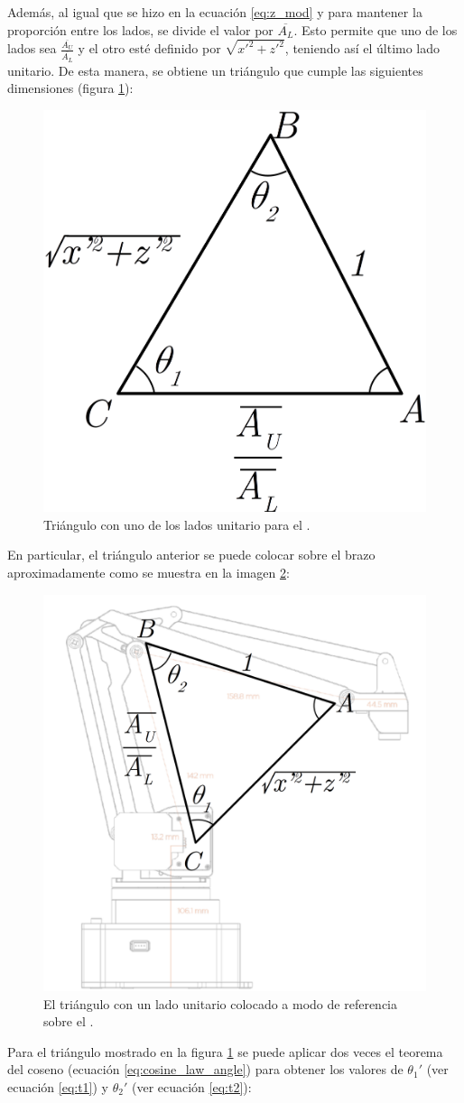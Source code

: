 Además, al igual que se hizo en la ecuación \ref{eq:z_mod} y para mantener la proporción
entre los lados, se divide el valor por $\overline{A_L}$. Esto permite que uno de los
lados sea $\frac{\overline{A_U}}{\overline{A_L}}$ y el otro esté definido por
$\sqrt{x'^2 + z'^2}$, teniendo así el último lado unitario.
De esta manera, se obtiene un triángulo que cumple las siguientes dimensiones
(figura \ref{fig:unitary_triangle}):

\begin{figure}[H]
    \centering
    \includegraphics[width=.3\linewidth]{pictures/ik_unitary_triangle.png}
    \caption{Triángulo con uno de los lados unitario para el \pArm{}.}
    \label{fig:unitary_triangle}
\end{figure}

En particular, el triángulo anterior se puede colocar sobre el brazo aproximadamente
como se muestra en la imagen \ref{fig:u_triangle_over_arm}:

\begin{figure}[H]
    \centering
    \includegraphics[width=.6\linewidth]{pictures/ik_triangle_over_arm.png}
    \caption{El triángulo con un lado unitario colocado a modo de referencia sobre el \pArm{}.}
    \label{fig:u_triangle_over_arm}
\end{figure}

Para el triángulo mostrado en la figura \ref{fig:unitary_triangle} se puede aplicar
dos veces el teorema del coseno (ecuación \ref{eq:cosine_law_angle}) para obtener
los valores de $\theta_1'$ (ver ecuación \ref{eq:t1}) y $\theta_2'$ (ver ecuación \ref{eq:t2}):

